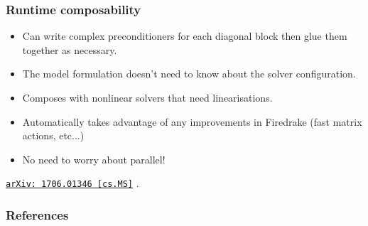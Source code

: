 \documentclass[presentation]{beamer}
\newcommand{\arxivlink}[2]{%
  \href{http://www.arxiv.org/abs/#1}%
  {{\small\texttt{arXiv:\,#1\,[#2]}}}%
}
\begin{document}
\begin{frame}
  \frametitle{Runtime composability}

  \begin{itemize}
  \item Can write complex preconditioners for each diagonal block then
    glue them together as necessary.

  \item The model formulation doesn't need to know about the solver
    configuration.

  \item Composes with nonlinear solvers that need linearisations.

  \item Automatically takes advantage of any improvements in Firedrake
    (fast matrix actions, etc...)

  \item No need to worry about parallel!
  \end{itemize}

  \textcite{Kirby:2017} \arxivlink{1706.01346}{cs.MS}.
\end{frame}


\appendix
\begin{frame}
  \frametitle{References}
  \printbibliography[heading=none]
\end{frame}
\end{document}
